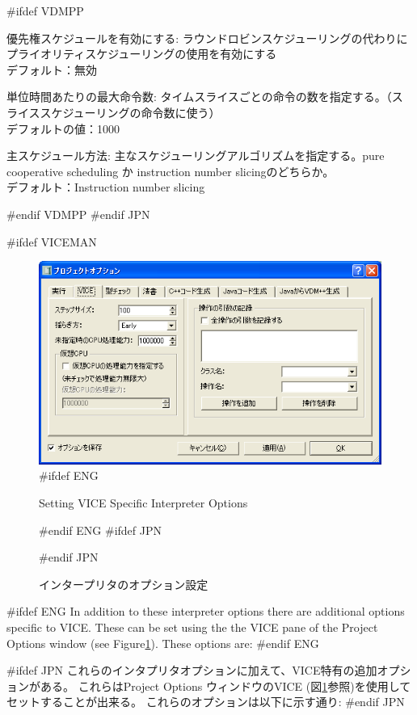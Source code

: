 \documentclass[\pformat,12pt]{article}
\newcommand{\guicmd}[1]{{\sf #1}}
\newcommand{\guicmd}[1]{{\gt #1}}
\begin{document}
\begin{list}{}{}
#ifdef VDMPP
\item[\guicmd{優先権スケジュールを有効にする}:]
  ラウンドロビンスケジューリングの代わりにプライオリティスケジューリングの使用を有効にする \\
  デフォルト：無効
  
\item[\guicmd{単位時間あたりの最大命令数}:]
  タイムスライスごとの命令の数を指定する。（スライススケジューリングの命令数に使う） \\
  デフォルトの値：1000\\
  
\item[\guicmd{主スケジュール方法}:]
  主なスケジューリングアルゴリズムを指定する。pure cooperative scheduling か 
  instruction number slicingのどちらか。 \\
  デフォルト：Instruction number slicing

#endif VDMPP
#endif JPN
\end{list}

#ifdef VICEMAN
\begin{figure}[tbh]
\begin{center}
\includegraphics[width=12.5cm]{viceOptions-vice.png}
#ifdef ENG
\caption{Setting VICE Specific Interpreter Options}
#endif ENG
#ifdef JPN
\caption{インタープリタのオプション設定}
#endif JPN
\label{fig:optintvice}
\end{center}
\end{figure}

#ifdef ENG
In addition to these interpreter options there are additional options
specific to VICE. These can be set using the the 
\guicmd{VICE} pane of the \guicmd{Project Options} window (see
Figure\ref{fig:optintvice}). These options are:
#endif ENG

#ifdef JPN
これらのインタプリタオプションに加えて、VICE特有の追加オプションがある。
これらは\guicmd{Project Options} ウィンドウの\guicmd{VICE} 
(図\ref{fig:optintvice}参照)を使用してセットすることが出来る。
これらのオプションは以下に示す通り:
#endif JPN
\end{document}
